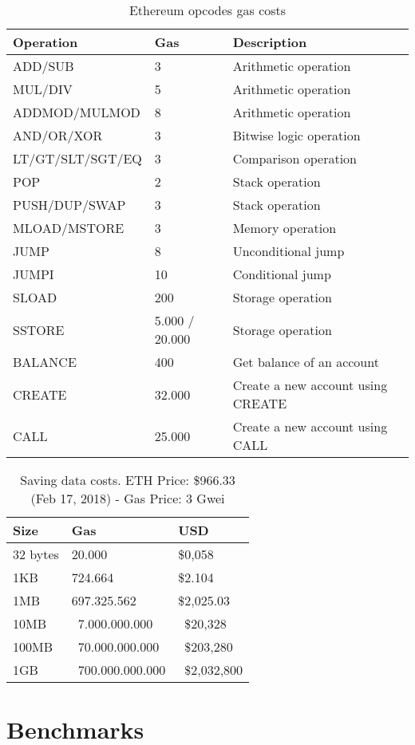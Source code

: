 \begin{table}[!ht]
\centering
\begin{tabular}{|l|l|l|}
\hline
 Operation & Gas  & Description \\ \hline
 ADD/SUB & 3 & Arithmetic operation \\ \hline
 MUL/DIV & 5 & Arithmetic operation \\ \hline
 ADDMOD/MULMOD & 8 & Arithmetic operation \\ \hline
 AND/OR/XOR & 3 & Bitwise logic operation \\ \hline
 LT/GT/SLT/SGT/EQ & 3 & Comparison operation \\ \hline
 POP & 2 & Stack operation \\ \hline
 PUSH/DUP/SWAP & 3 & Stack operation \\ \hline
 MLOAD/MSTORE & 3 & Memory operation \\ \hline
 JUMP & 8 & Unconditional jump \\ \hline
 JUMPI & 10 & Conditional jump \\ \hline
 SLOAD & 200 & Storage operation \\ \hline
 SSTORE & 5.000 / 20.000 & Storage operation \\ \hline
 BALANCE & 400 & Get balance of an account \\ \hline
 CREATE & 32.000 & Create a new account using CREATE \\ \hline
 CALL & 25.000 & Create a new account using CALL \\ \hline
\end{tabular}
\caption{Ethereum opcodes gas costs}
\label{table:opcode_gas_cost}
\end{table}

\begin{table}[!ht]
\centering
\begin{tabular}{|l|l|l|}
\hline
 Size & Gas  & USD \\ \hline
 32 bytes & 20.000  & \$0,058 \\ \hline
 1KB & 724.664  & \$2.104 \\ \hline
 1MB & 697.325.562  & \$2,025.03 \\ \hline
 10MB & ~7.000.000.000  & ~\$20,328 \\ \hline
 100MB & ~70.000.000.000  & ~\$203,280 \\ \hline
 1GB & ~700.000.000.000  & ~\$2,032,800 \\ \hline
\end{tabular}
\caption{Saving data costs. ETH Price: \$966.33 (Feb 17, 2018) - Gas Price: 3 Gwei}
\label{table:bytes_usd_cost}
\end{table}

\section{Benchmarks}
\label{evaluation:benchmarks}
